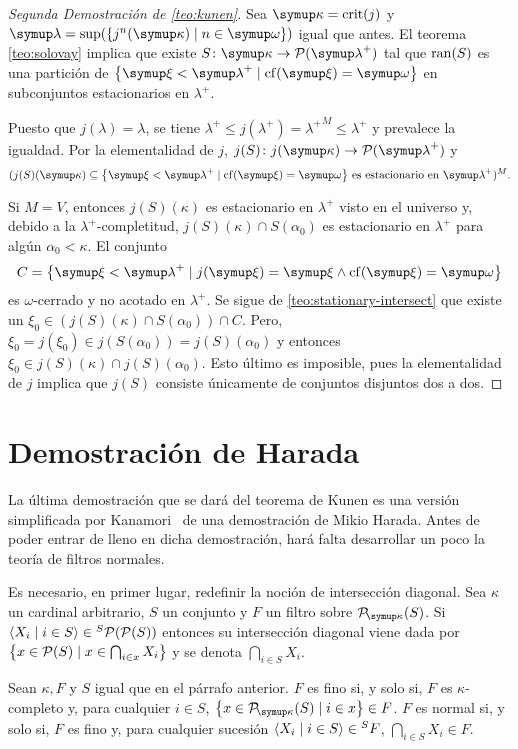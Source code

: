 \documentclass
[
  12pt,
  letterpaper,
  openany,
  oneside,
]{book}
\begin{document}
\begin{proof}[Segunda Demostración de \ref{teo:kunen}]
	Sea $\kappa=\crit{j}$ y $\lambda=\sup(\set{j^n(\kappa)\mid n\in\omega})$ igual que antes.
	El teorema \ref{teo:solovay} implica que existe $S\colon\kappa\to\pwset{\lambda^+}$ tal que
	$\operatorname{ran}(S)$ es una partición de $\set{\xi < \lambda^+\mid \cf(\xi) = \omega}$ en subconjuntos
	estacionarios en $\lambda^+$.

	Puesto que $j(\lambda)=\lambda$, se tiene $\lambda^+\leq j(\lambda^+) = {\lambda^+}^M\leq \lambda^+$
	y prevalece la igualdad. Por la elementalidad de $j$, $j(S)\colon j(\kappa)\to\pwset{\lambda^+}$ y
	\[
		(
		    j(S)(\kappa)\subseteq\set{\xi < \lambda^+\mid \cf(\xi) = \omega}
		    \,\text{es estacionario en $\lambda^+$}
		)^M.
	\]

	Si $M=V$, entonces $j(S)(\kappa)$ es estacionario en $\lambda^+$ visto en el universo y,
	debido a la $\lambda^+$-completitud, $j(S)(\kappa)\cap S(\alpha_0)$ es estacionario en $\lambda^+$
	para algún $\alpha_0<\kappa$. El conjunto
	\[
	    C = \set{\xi<\lambda^+\mid j(\xi)=\xi \land \cf(\xi)=\omega}
	\]
	es $\omega$-cerrado y no acotado en $\lambda^+$. Se sigue de \ref{teo:stationary-intersect} que
	existe un $\xi_0\in (j(S)(\kappa)\cap S(\alpha_0))\cap C$. Pero,
	$\xi_0 = j(\xi_0)\in j(S(\alpha_0)) = j(S)(\alpha_0)$ y entonces $\xi_0\in j(S)(\kappa)\cap j(S)(\alpha_0)$.
	Esto último es imposible, pues la elementalidad de $j$ implica que $j(S)$ consiste únicamente de conjuntos
	disjuntos dos a dos.
\end{proof}

\section{Demostración de Harada}

La última demostración que se dará del teorema de Kunen es una versión simplificada
por Kanamori~\autocite{kanamori_higher_2009} de una demostración de Mikio Harada.
Antes de poder entrar de lleno en dicha demostración, hará falta desarrollar
un poco la teoría de filtros normales.

Es necesario, en primer lugar, redefinir la noción de intersección diagonal.
Sea $\kappa$ un cardinal arbitrario, $S$ un conjunto y $F$ un filtro sobre $\pwset[\kappa]{S}$.
Si $\seq{X_i\mid i\in S}\in {}^S\pwset{\pwset S}$ entonces su intersección diagonal viene
dada por $\set{x\in\pwset{S}\mid x\in\bigcap_{i\in x} X_i}$ y se denota $\dint_{i\in S} X_i$.

\begin{defi}
    Sean $\kappa, F$ y $S$ igual que en el párrafo anterior.
    $F$ es fino si, y solo si, $F$ es $\kappa$-completo y, para cualquier $i\in S$,
    $\set{x\in\pwset[\kappa]{S}\mid i\in x}\in F$.
    $F$ es normal si, y solo si, $F$ es fino y, para cualquier sucesión
    $\langle X_i\mid i\in S \rangle\in {}^SF$, $\dint_{i\in S} X_i\in F$.
\end{defi}
\end{document}
